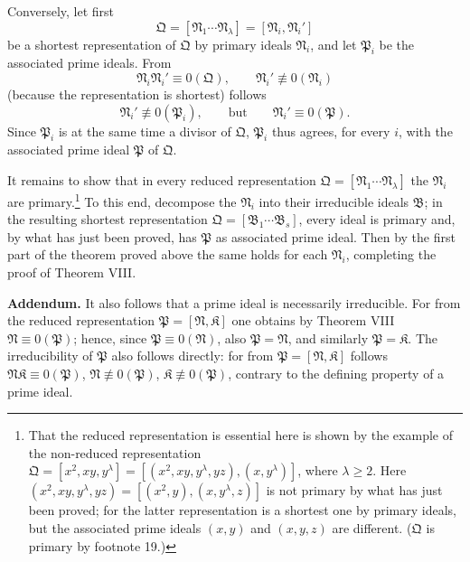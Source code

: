 \documentclass[11pt]{article}
\newcommand{\ideal}[1]{\mathfrak{#1}}
\begin{document}
Conversely, let first
\[
 \ideal Q=[\ideal N_1\cdots\ideal N_\lambda]=[\ideal N_i,\ideal N_i']
\]
be a shortest representation of $\ideal Q$ by primary ideals $\ideal N_i$, and let $\ideal P_i$ be the associated prime ideals. From
\[
 \ideal N_i\ideal N_i'\equiv0(\ideal Q),
 \qquad
 \ideal N_i'\not\equiv0(\ideal N_i)
\]
(because the representation is shortest) follows
\[
 \ideal N_i'\not\equiv0(\ideal P_i),
 \qquad\text{but}\qquad
 \ideal N_i'\equiv0(\ideal P).
\]
Since $\ideal P_i$ is at the same time a divisor of $\ideal Q$, $\ideal P_i$ thus agrees, for every $i$, with the associated prime ideal $\ideal P$ of $\ideal Q$.

It remains to show that in every reduced representation $\ideal Q=[\ideal N_1\cdots\ideal N_\lambda]$ the $\ideal N_i$ are primary.\footnote{That the reduced representation is essential here is shown by the example of the non-reduced representation $\ideal Q=[x^2,xy,y^\lambda]=[(x^2,xy,y^\lambda,yz),(x,y^\lambda)]$, where $\lambda\ge2$. Here $(x^2,xy,y^\lambda,yz)=[(x^2,y),(x,y^\lambda,z)]$ is not primary by what has just been proved; for the latter representation is a shortest one by primary ideals, but the associated prime ideals $(x,y)$ and $(x,y,z)$ are different. ($\ideal Q$ is primary by footnote 19.)} To this end, decompose the $\ideal N_i$ into their irreducible ideals $\ideal B$; in the resulting shortest representation $\ideal Q=[\ideal B_1\cdots\ideal B_s]$, every ideal is primary and, by what has just been proved, has $\ideal P$ as associated prime ideal. Then by the first part of the theorem proved above the same holds for each $\ideal N_i$, completing the proof of Theorem VIII.

\textbf{Addendum.} It also follows that a prime ideal is necessarily irreducible. For from the reduced representation $\ideal P=[\ideal N,\ideal K]$ one obtains by Theorem VIII $\ideal N\equiv0(\ideal P)$; hence, since $\ideal P\equiv0(\ideal N)$, also $\ideal P=\ideal N$, and similarly $\ideal P=\ideal K$. The irreducibility of $\ideal P$ also follows directly: for from $\ideal P=[\ideal N,\ideal K]$ follows $\ideal N\ideal K\equiv0(\ideal P)$, $\ideal N\not\equiv0(\ideal P)$, $\ideal K\not\equiv0(\ideal P)$, contrary to the defining property of a prime ideal.
\end{document}
